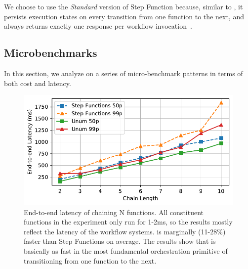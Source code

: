 We choose to use the \emph{Standard} version of Step Function because, similar
to \name{}, it persists execution states on every transition from one function
to the next, and always returns exactly one response per workflow
invocation~\cite{aws-step-functions-exec-gntee}.




\subsection{Microbenchmarks}\label{sec:eval:micro}

In this section, we analyze \name{} on a series of micro-benchmark patterns in
terms of both cost and latency.

\begin{figure}[t!]
	\centering
	\includegraphics[width=\columnwidth]{figures/ChainMicroLatency.pdf}
	\caption{End-to-end latency of chaining N functions. All constituent
		functions in the experiment only run for 1-2ms, so the results mostly
		reflect the latency of the workflow systems. \name{} is marginally
		(11-28\%) faster than Step Functions on average. The results show that
		\name{} is basically as fast in the most fundamental orchestration
		primitive of transitioning from one function to the next.}
	\label{fig:chainmicrolatency}
\end{figure}

